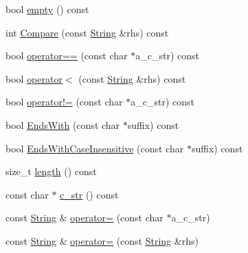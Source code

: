 \begin{DoxyCompactItemize}
\item 
bool \hyperlink{classtesting_1_1internal_1_1String_ac6e61de369e994009e36f344f99c15ad}{empty} () const 
\item 
int \hyperlink{classtesting_1_1internal_1_1String_a454019802adc8561c0f1cf3c9564d682}{\-Compare} (const \hyperlink{classtesting_1_1internal_1_1String}{\-String} \&rhs) const 
\item 
bool \hyperlink{classtesting_1_1internal_1_1String_aa0fc39e751abca6274ba296779e9ec0e}{operator==} (const char $\ast$a\-\_\-c\-\_\-str) const 
\item 
bool \hyperlink{classtesting_1_1internal_1_1String_a7aac1e703aebb33a2cb1aab0e3e36ea7}{operator$<$} (const \hyperlink{classtesting_1_1internal_1_1String}{\-String} \&rhs) const 
\item 
bool \hyperlink{classtesting_1_1internal_1_1String_a7124fa063a9ec943dc2d1d85abee99c1}{operator!=} (const char $\ast$a\-\_\-c\-\_\-str) const 
\item 
bool \hyperlink{classtesting_1_1internal_1_1String_ad95186cd1bc0b0d6b482487057d8198e}{\-Ends\-With} (const char $\ast$suffix) const 
\item 
bool \hyperlink{classtesting_1_1internal_1_1String_a5d6a5d48da3213d93cb038ae045d06e3}{\-Ends\-With\-Case\-Insensitive} (const char $\ast$suffix) const 
\item 
size\-\_\-t \hyperlink{classtesting_1_1internal_1_1String_a2edf269e5cd490f7863c9150bb910c85}{length} () const 
\item 
const char $\ast$ \hyperlink{classtesting_1_1internal_1_1String_a89da6be964480b4c86334e4e337d3cf2}{c\-\_\-str} () const 
\item 
const \hyperlink{classtesting_1_1internal_1_1String}{\-String} \& \hyperlink{classtesting_1_1internal_1_1String_a110cff322a1833c1656928e12f433a36}{operator=} (const char $\ast$a\-\_\-c\-\_\-str)
\item 
const \hyperlink{classtesting_1_1internal_1_1String}{\-String} \& \hyperlink{classtesting_1_1internal_1_1String_aef28784c33be4941a4d09907d58dd946}{operator=} (const \hyperlink{classtesting_1_1internal_1_1String}{\-String} \&rhs)
\end{DoxyCompactItemize}
